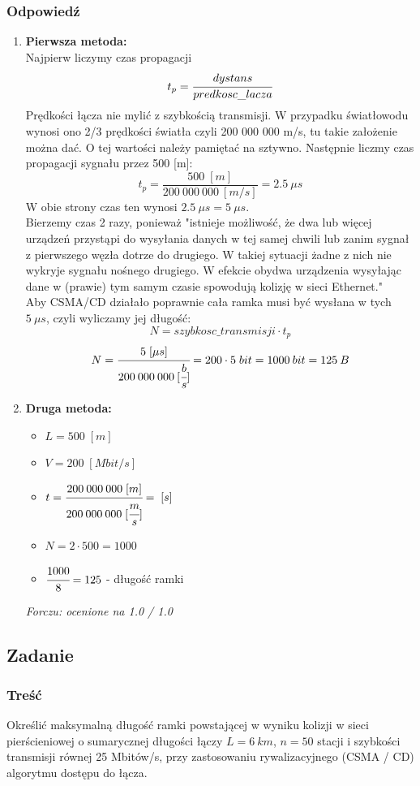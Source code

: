 		\subsubsection{Odpowiedź}
		\begin{enumerate}
			\item \textbf{Pierwsza metoda:}\\
			Najpierw liczymy czas propagacji $$ t_p = \cfrac{dystans}{predkosc\_lacza} $$
			Prędkości łącza nie mylić z szybkością transmisji. W przypadku światłowodu wynosi ono 2/3 prędkości światła czyli 200 000 000 m/s, tu takie założenie można dać. O tej wartości należy pamiętać na sztywno. Następnie liczmy czas propagacji sygnału przez 500 [m]:
			$$ t_p=\frac{500\;[m]}{200\:000\:000\:[m/s]}=2.5\:\mu s $$
			W obie strony czas ten wynosi $ 2.5\:\mu s = 5\:\mu s$.\\
			Bierzemy czas 2 razy, ponieważ "istnieje możliwość, że dwa lub więcej urządzeń przystąpi do wysyłania danych w tej samej chwili lub zanim sygnał z pierwszego węzła dotrze do drugiego. W takiej sytuacji żadne z nich nie wykryje sygnału nośnego drugiego. W efekcie obydwa urządzenia wysyłając dane w (prawie) tym samym czasie spowodują kolizję w sieci Ethernet."\\
			Aby CSMA/CD działało poprawnie cała ramka musi być wysłana w tych $5\:\mu s$, czyli wyliczamy jej długość:
			$$ N=szybkosc\_transmisji\cdot t_p $$
			$$ N=\cfrac{5\;[\mu s]}{200\:000\:000\:[\cfrac{b}{s}]} =200\cdot5\;bit=1000\:bit=125\:B $$
			\item \textbf{Druga metoda:}\\
			\begin{itemize}
				\item $ L=500\;[m] $
				\item $ V=200\;[Mbit/s] $
				\item $ t=\cfrac{200\:000\:000\;[{m}]}{200\:000\:000\;[\cfrac{m}{s}]}=\;[s] $
				\item $ N=2\cdot500=1000 $
				\item $ \cfrac{1000}{8}=125 $ - długość ramki
			\end{itemize}
			{\small \emph{Forczu: ocenione na 1.0 / 1.0}}
		\end{enumerate}
			
	\subsection{Zadanie}
		\subsubsection{Treść}
			Określić maksymalną długość ramki powstającej w wyniku kolizji w sieci pierścieniowej o sumarycznej długości łączy $ L=6\:km $, $ n=50 $ stacji i szybkości transmisji równej 25 Mbitów/s, przy zastosowaniu rywalizacyjnego (CSMA / CD) algorytmu dostępu do łącza.
